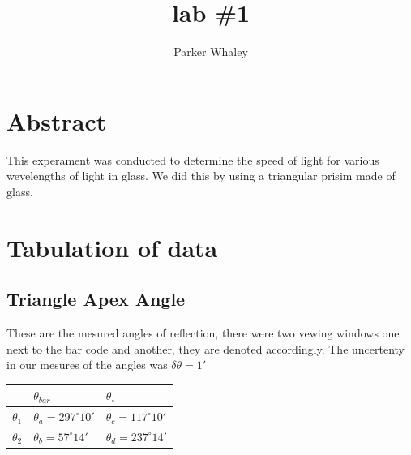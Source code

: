 \documentclass[12pt,a4paper]{article}
\author{Parker Whaley}
\title{lab \#1}
\begin{document}
\maketitle

\section{Abstract}
This experament was conducted to determine the speed of light for various wevelengths of light in glass.  We did this by using a triangular prisim made of glass.

\section{Tabulation of data}
\subsection{Triangle Apex Angle}
These are the mesured angles of reflection, there were two vewing windows one next to the bar code and another, they are denoted accordingly.  The uncertenty in our mesures of the angles was $\delta\theta=1'$\\
\begin{tabular}{| l | l | l |}
\hline
  & $\theta_{bar}$ & $\theta_{\circ}$\\
\hline
$\theta_1$ & $\theta_a= 297^\circ 10'$ & $\theta_c =117^\circ 10'$\\
\hline
$\theta_2$ & $\theta_b= 57^\circ 14'$ & $\theta_d= 237^\circ 14'$\\
\hline

\end{tabular}
\\
\end{document}
